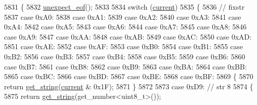 \begin{DoxyCode}
5831     \{
5832         \hyperlink{classnlohmann_1_1detail_1_1binary__reader_a1dfc55484af3a896c376b41cd99f3e15}{unexpect\_eof}();
5833 
5834         \textcolor{keywordflow}{switch} (\hyperlink{classnlohmann_1_1detail_1_1binary__reader_a7e994e201b215cd6d6ae28a1853f43e0}{current})
5835         \{
5836             \textcolor{comment}{// fixstr}
5837             \textcolor{keywordflow}{case} 0xA0:
5838             \textcolor{keywordflow}{case} 0xA1:
5839             \textcolor{keywordflow}{case} 0xA2:
5840             \textcolor{keywordflow}{case} 0xA3:
5841             \textcolor{keywordflow}{case} 0xA4:
5842             \textcolor{keywordflow}{case} 0xA5:
5843             \textcolor{keywordflow}{case} 0xA6:
5844             \textcolor{keywordflow}{case} 0xA7:
5845             \textcolor{keywordflow}{case} 0xA8:
5846             \textcolor{keywordflow}{case} 0xA9:
5847             \textcolor{keywordflow}{case} 0xAA:
5848             \textcolor{keywordflow}{case} 0xAB:
5849             \textcolor{keywordflow}{case} 0xAC:
5850             \textcolor{keywordflow}{case} 0xAD:
5851             \textcolor{keywordflow}{case} 0xAE:
5852             \textcolor{keywordflow}{case} 0xAF:
5853             \textcolor{keywordflow}{case} 0xB0:
5854             \textcolor{keywordflow}{case} 0xB1:
5855             \textcolor{keywordflow}{case} 0xB2:
5856             \textcolor{keywordflow}{case} 0xB3:
5857             \textcolor{keywordflow}{case} 0xB4:
5858             \textcolor{keywordflow}{case} 0xB5:
5859             \textcolor{keywordflow}{case} 0xB6:
5860             \textcolor{keywordflow}{case} 0xB7:
5861             \textcolor{keywordflow}{case} 0xB8:
5862             \textcolor{keywordflow}{case} 0xB9:
5863             \textcolor{keywordflow}{case} 0xBA:
5864             \textcolor{keywordflow}{case} 0xBB:
5865             \textcolor{keywordflow}{case} 0xBC:
5866             \textcolor{keywordflow}{case} 0xBD:
5867             \textcolor{keywordflow}{case} 0xBE:
5868             \textcolor{keywordflow}{case} 0xBF:
5869             \{
5870                 \textcolor{keywordflow}{return} \hyperlink{classnlohmann_1_1detail_1_1binary__reader_a195b573a807da6d5841a898c6f74e03c}{get\_string}(\hyperlink{classnlohmann_1_1detail_1_1binary__reader_a7e994e201b215cd6d6ae28a1853f43e0}{current} & 0x1F);
5871             \}
5872 
5873             \textcolor{keywordflow}{case} 0xD9: \textcolor{comment}{// str 8}
5874             \{
5875                 \textcolor{keywordflow}{return} \hyperlink{classnlohmann_1_1detail_1_1binary__reader_a195b573a807da6d5841a898c6f74e03c}{get\_string}(get\_number<uint8\_t>());

\end{DoxyCode}

